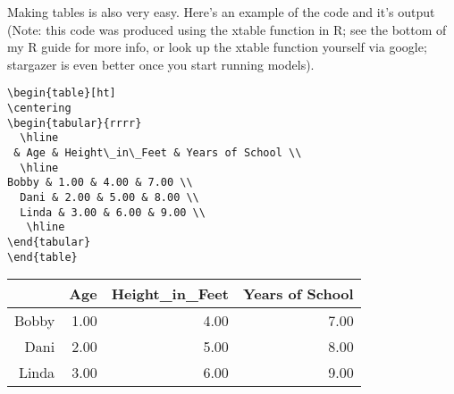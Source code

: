 \documentclass{article}
\begin{document}
Making tables is also very easy. Here's an example of the code and it's output (Note: this code was produced using the xtable function in R; see the bottom of my R guide for more info, or look up the xtable function yourself via google; stargazer is even better once you start running models). 
\begin{verbatim}
\begin{table}[ht]
\centering
\begin{tabular}{rrrr}
  \hline
 & Age & Height\_in\_Feet & Years of School \\ 
  \hline
Bobby & 1.00 & 4.00 & 7.00 \\ 
  Dani & 2.00 & 5.00 & 8.00 \\ 
  Linda & 3.00 & 6.00 & 9.00 \\ 
   \hline
\end{tabular}
\end{table}
\end{verbatim}

\begin{table}[ht]
\centering
\begin{tabular}{rrrr}
  \hline
 & Age & Height\_in\_Feet & Years of School \\ 
  \hline
Bobby & 1.00 & 4.00 & 7.00 \\ 
  Dani & 2.00 & 5.00 & 8.00 \\ 
  Linda & 3.00 & 6.00 & 9.00 \\ 
   \hline
\end{tabular}
\end{table}
\end{document}
